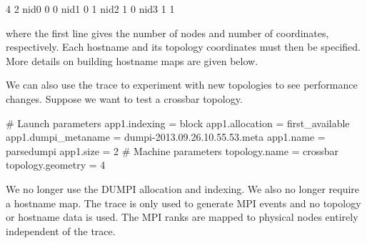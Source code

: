 \begin{ViFile}
4 2
nid0 0 0
nid1 0 1
nid2 1 0
nid3 1 1
\end{ViFile}
where the first line gives the number of nodes and number of coordinates, respectively.
Each hostname and its topology coordinates must then be specified.
More details on building hostname maps are given below.

We can also use the trace to experiment with new topologies to see performance changes.
Suppose we want to test a crossbar topology.

\begin{ViFile}
# Launch parameters
app1.indexing = block
app1.allocation = first_available
app1.dumpi_metaname = dumpi-2013.09.26.10.55.53.meta
app1.name = parsedumpi
app1.size = 2
# Machine parameters
topology.name = crossbar
topology.geometry = 4
\end{ViFile}
We no longer use the DUMPI allocation and indexing. 
We also no longer require a hostname map.
The trace is only used to generate MPI events and no topology or hostname data is used.
The MPI ranks are mapped to physical nodes entirely independent of the trace.

